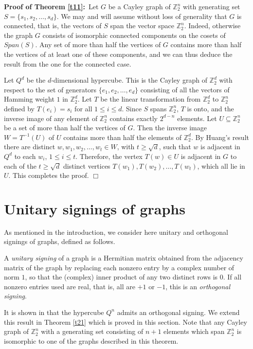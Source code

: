 \noindent
{\bf Proof of Theorem \ref{t11}:}\,
Let $G$ be a Cayley graph of ${\mathbb{Z}_{2}^{n}}$ with generating set $S=\{s_1,s_2,
\ldots ,s_d\}$. We may and will 
assume without loss of generality that $G$ is connected, that is,
the vectors of
$S$ span the vector space ${\mathbb{Z}_{2}^{n}}$. 
Indeed, otherwise the graph $G$ consists of
isomorphic connected components on the cosets of $Span(S)$. Any set of
more than half the vertices of $G$ contains more than half the vertices
of at least one of these components, and we can thus deduce the result
from the one for the connected case.

Let $Q^d$ be the $d$-dimensional
hypercube. This is the Cayley graph of ${\mathbb{Z}_{2}^{d}}$ with respect to the
set of generators $\{e_1,e_2, \ldots ,e_d\}$ consisting of all the
vectors of Hamming weight $1$ in ${\mathbb{Z}_{2}^{d}}$. Let $T$ be the linear
transformation from ${\mathbb{Z}_{2}^{d}}$ to ${\mathbb{Z}_{2}^{n}}$ defined by $T(e_i)=s_i$
for all $1 \leq i \leq d$. Since $S$ spans ${\mathbb{Z}_{2}^{n}}$, $T$ is onto, and the
inverse image of any element of ${\mathbb{Z}_{2}^{n}}$ contains exactly
$2^{d-n}$ elements. Let $U \subseteq {\mathbb{Z}_{2}^{n}}$ be a set of more than 
half the vertices of $G$. Then the inverse image $W=T^{-1}(U)$
of $U$ contains more than half the elements of ${\mathbb{Z}_{2}^{d}}$. 
By Huang's result there are distinct $w, w_1,w_2, \ldots ,w_t
\in W$, with $t \geq \sqrt d$, such that $w$ is adjacent 
in $Q^d$ to each $w_i$, $1 \leq i \leq t$. Therefore, the vertex
$T(w) \in U$ is adjacent in $G$ to each of the $t \geq \sqrt d$ 
distinct vertices $T(w_1), T(w_2), \ldots ,T(w_t)$, which all lie in
$U$. This completes the proof. \hfill $\Box$

\section{Unitary signings of graphs} \label{sec: unitary signings}

As mentioned in the introduction, we consider here
unitary and orthogonal signings of graphs, defined as follows.
\begin{definition}
A {\em unitary signing}
of a graph is a Hermitian matrix obtained from the 
adjacency matrix of the graph by replacing each nonzero entry by
a complex number of norm $1$, so that the (complex) inner product of
any two distinct rows is $0$. If all nonzero entries used are real,
that is, all are $+1$ or $-1$, this is an {\em orthogonal signing}.
\end{definition}
It is shown in \cite{Hu} that the hypercube $Q^n$ admits an orthogonal
signing. We extend this result in Theorem \ref{t21} which is proved
in this section.
Note that any Cayley graph of ${\mathbb{Z}_{2}^{n}}$ with a generating set consisting
of $n+1$ elements which span ${\mathbb{Z}_{2}^{n}}$ is isomorphic to one of the
graphs described in this theorem.

